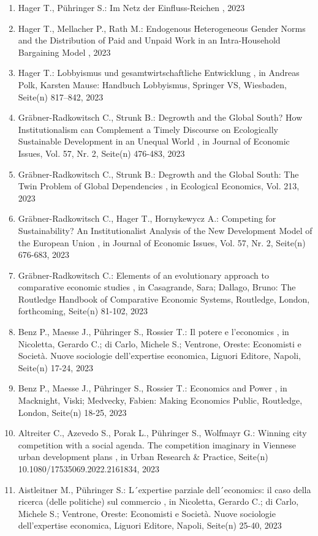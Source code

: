 \begin{enumerate}[leftmargin=*, labelsep=0.5cm]
	 \item Hager T., Pühringer S.:  Im Netz der Einfluss-Reichen  , 2023
	 \item Hager T., Mellacher P., Rath M.:  Endogenous Heterogeneous Gender Norms and the Distribution of Paid and Unpaid Work in an Intra-Household Bargaining Model  , 2023
	 \item Hager T.:  Lobbyismus und gesamtwirtschaftliche Entwicklung  , in Andreas Polk, Karsten Mause: Handbuch Lobbyismus, Springer VS, Wiesbaden, Seite(n) 817–842, 2023
	 \item Gräbner-Radkowitsch C., Strunk B.:  Degrowth and the Global South? How Institutionalism can Complement a Timely Discourse on Ecologically Sustainable Development in an Unequal World  , in Journal of Economic Issues, Vol. 57, Nr. 2, Seite(n) 476-483, 2023
	 \item Gräbner-Radkowitsch C., Strunk B.:  Degrowth and the Global South: The Twin Problem of Global Dependencies  , in Ecological Economics, Vol. 213, 2023
	 \item Gräbner-Radkowitsch C., Hager T., Hornykewycz A.:  Competing for Sustainability? An Institutionalist Analysis of the New Development Model of the European Union  , in Journal of Economic Issues, Vol. 57, Nr. 2, Seite(n) 676-683, 2023
	 \item Gräbner-Radkowitsch C.:  Elements of an evolutionary approach to comparative economic studies  , in Casagrande, Sara; Dallago, Bruno: The Routledge Handbook of Comparative Economic Systems, Routledge, London, forthcoming, Seite(n) 81-102, 2023
	 \item Benz P., Maesse J., Pühringer S., Rossier T.:  Il potere e l'economics  , in Nicoletta, Gerardo C.; di Carlo, Michele S.; Ventrone, Oreste: Economisti e Società. Nuove sociologie dell'expertise economica, Liguori Editore, Napoli, Seite(n) 17-24, 2023
	 \item Benz P., Maesse J., Pühringer S., Rossier T.:  Economics and Power  , in Macknight, Viski; Medvecky, Fabien: Making Economics Public, Routledge, London, Seite(n) 18-25, 2023
	 \item Altreiter C., Azevedo S., Porak L., Pühringer S., Wolfmayr G.:  Winning city competition with a social agenda. The competition imaginary in Viennese urban development plans  , in Urban Research & Practice, Seite(n) 10.1080/17535069.2022.2161834, 2023
	 \item Aistleitner M., Pühringer S.:  L´expertise parziale dell´economics: il caso della ricerca (delle politiche) sul commercio  , in Nicoletta, Gerardo C.; di Carlo, Michele S.; Ventrone, Oreste: Economisti e Società. Nuove sociologie dell'expertise economica, Liguori Editore, Napoli, Seite(n) 25-40, 2023

\end{enumerate}
